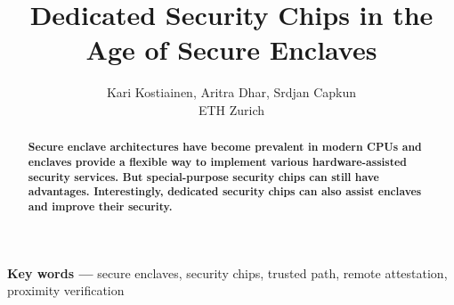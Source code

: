 

\graphicspath{{images/}}

\title{Dedicated Security Chips in the Age of Secure Enclaves} 

\author{Kari Kostiainen, Aritra Dhar, Srdjan Capkun \\ ETH Zurich}


\maketitle
\thispagestyle{empty}

\begin{abstract}
\textbf{Secure enclave architectures have become prevalent in modern CPUs and enclaves provide a flexible way to implement various hardware-assisted security services. But special-purpose security chips can still have advantages. Interestingly, dedicated security chips can also assist enclaves and improve their security.}
\end{abstract}

\vspace{10pt}
\noindent
\textbf{Key words ---} secure enclaves, security chips, trusted path, remote attestation, proximity verification








{\small

}
 

